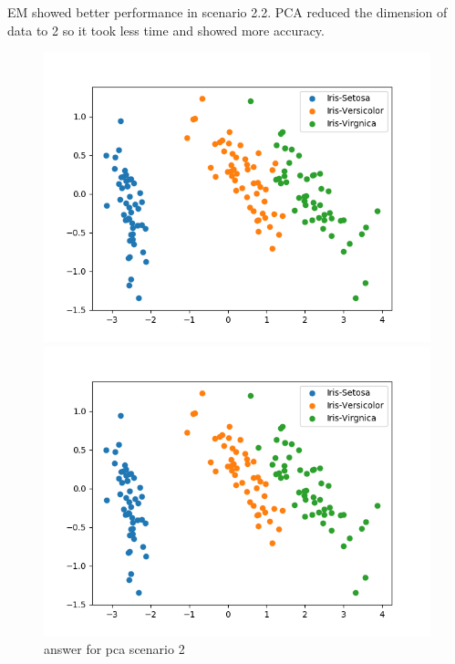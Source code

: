 \documentclass[a4paper]{article}
\begin{document}
        EM showed better performance in scenario 2.2. PCA reduced the dimension of data to 2 so it took less time and showed more accuracy.

        \begin{figure}[h!]
            \centering
            \begin{minipage}[t]{6.5cm}
              \includegraphics[width=1.0\textwidth]{pca_em_2_ans.png}
              \caption{answer for pca scenario 2}
            \end{minipage}
            \hspace{2cm}
            \begin{minipage}[t]{6.5cm}
              \includegraphics[width=1.0\textwidth]{pca_em_2_1.png}

\end{minipage}
\end{figure}
\end{document}

